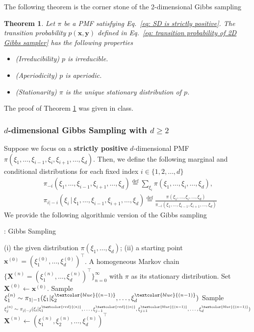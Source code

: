 \documentclass[11pt,letterpaper, leqno]{article}
\newtheorem{theorem}{Theorem}
\numberwithin{equation}{section}
\numberwithin{theorem}{section}
\numberwithin{lemma}{section}
\numberwithin{corollary}{section}
\numberwithin{definition}{section}
\numberwithin{proposition}{section}
\numberwithin{remark}{section}
\numberwithin{example}{section}
\newcommand{\T}{\intercal}
\begin{document}
The following theorem is the corner stone of the 2-dimensional Gibbs sampling
\begin{theorem}\label{thm: corner stone of 2D Gibbs sampling}
Let $\pi$ be a PMF satisfying Eq.~\eqref{eq: SD is strictly positive}. The transition probability $p(\boldsymbol{x}, \boldsymbol{y})$ defined in Eq.~\eqref{eq: transition probability of 2D Gibbs sampler} has the following properties
\begin{itemize}
    \item (Irreducibility) $p$ is irreducible.
    \item (Aperiodicity) $p$ is aperiodic.
    \item (Stationarity) $\pi$ is the unique stationary distribution of $p$.
\end{itemize}
\end{theorem}
\noindent The proof of Theorem \ref{thm: corner stone of 2D Gibbs sampling} was given in class.

\subsubsection{$d$-dimensional Gibbs Sampling with $d\ge2$}

Suppose we focus on a \textbf{strictly positive} $d$-dimensional PMF $\pi(\xi_1,\ldots,\xi_{i-1},\xi_i, \xi_{i+1},\ldots, \xi_d)$. Then, we define the following marginal and conditional distributions for each fixed index $i\in\{1,2,\ldots,d\}$
\begin{align*}
    & \pi_{-i}(\xi_1,\ldots,\xi_{i-1},\xi_{i+1},\ldots,\xi_d)\overset{\operatorname{def}}{=}\sum_{\xi_i} \pi(\xi_1,\ldots,\xi_i,\ldots,\xi_d), \\
    & \pi_{i\vert-i}(\xi_i \,\vert\, \xi_1,\ldots,\xi_{i-1},\xi_{i+1},\ldots,\xi_d) \overset{\operatorname{def}}{=} \frac{ \pi(\xi_1,\ldots,\xi_i,\ldots,\xi_d) }{ \pi_{-i}(\xi_1,\ldots,\xi_{i-1},\xi_{i+1},\ldots,\xi_d) }
\end{align*}
We provide the following algorithmic version of the Gibbs sampling
\begin{algorithm}[H]
\caption{: Gibbs Sampling}\label{algorithm: Gibbs sampling}
\begin{algorithmic}[1]
    \INPUT (i) the given distribution $\pi(\xi_1,\ldots,\xi_d)$; (ii) a starting point $\boldsymbol{x}^{(0)}=(\xi^{(0)}_1,\ldots, \xi^{(0)}_d)^\T$.
    \OUTPUT A homogeneous Markov chain $\{\boldsymbol{X}^{(n)}=(\xi_1^{(n)}, \ldots, \xi_d^{(n)})^\T\}_{n=0}^\infty$ with $\pi$ as its stationary distribution.
    \STATE Set $\boldsymbol{X}^{(0)}  \leftarrow\boldsymbol{x}^{(0)}$.
    \STATE Sample $\xi_1^{(n)}\sim \pi_{1\vert-1}(\xi_1\vert \xi_2^{\textcolor{blue}{(n-1)}}, \ldots, \xi_d^{\textcolor{blue}{(n-1)}})$
    \STATE Sample $\xi_j^{(n)} \sim \pi_{j\vert-j}(\xi_i\vert \xi_1^{\textcolor{red}{(n)}},\ldots,\xi_{j-1}^{\textcolor{red}{(n)}}, \xi_{j+1}^{\textcolor{blue}{(n-1)}},\ldots, \xi_{d}^{\textcolor{blue}{(n-1)}})$
    \ENDFOR
    $\boldsymbol{X}^{(n)} \leftarrow (\xi_1^{(n)}, \xi_2^{(n)}, \ldots, \xi_d^{(n)})^\T$
    \ENDFOR
\end{algorithmic}
\end{algorithm}
\end{document}

